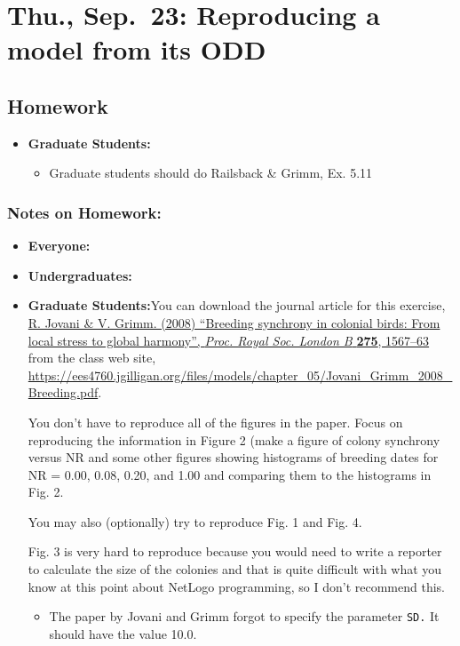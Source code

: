 \documentclass[
]{article}
\providecommand{\tightlist}{%
  \setlength{\itemsep}{0pt}\setlength{\parskip}{0pt}}
\begin{document}
\hypertarget{thu.-sep.-23-reproducing-a-model-from-its-odd}{%
\section{Thu., Sep.~23: Reproducing a model from its
ODD}\label{thu.-sep.-23-reproducing-a-model-from-its-odd}}

\hypertarget{homework-5}{%
\subsection{Homework}\label{homework-5}}

\begin{itemize}
\tightlist
\item
  \textbf{Graduate Students:}

  \begin{itemize}
  \tightlist
  \item
    Graduate students should do Railsback \& Grimm, Ex. 5.11
  \end{itemize}
\end{itemize}

\hypertarget{notes-on-homework-3}{%
\subsubsection{Notes on Homework:}\label{notes-on-homework-3}}

\begin{itemize}
\item
  \textbf{Everyone:}
\item
  \textbf{Undergraduates:}
\item
  \textbf{Graduate Students:}You can download the journal article for
  this exercise,
  \href{/files/models/chapter_05/Jovani_Grimm_2008_Breeding.pdf}{R.
  Jovani \& V. Grimm. (2008) ``Breeding synchrony in colonial birds:
  From local stress to global harmony'', \emph{Proc. Royal Soc. London
  B} \textbf{275}, 1567--63} from the class web site,
  \url{https://ees4760.jgilligan.org/files/models/chapter_05/Jovani_Grimm_2008_Breeding.pdf}.

  You don't have to reproduce all of the figures in the paper. Focus on
  reproducing the information in Figure 2 (make a figure of colony
  synchrony versus NR and some other figures showing histograms of
  breeding dates for NR = 0.00, 0.08, 0.20, and 1.00 and comparing them
  to the histograms in Fig. 2.

  You may also (optionally) try to reproduce Fig. 1 and Fig. 4.

  Fig. 3 is very hard to reproduce because you would need to write a
  reporter to calculate the size of the colonies and that is quite
  difficult with what you know at this point about NetLogo programming,
  so I don't recommend this.

  \begin{itemize}
  \tightlist
  \item
    The paper by Jovani and Grimm forgot to specify the parameter
    \texttt{SD.} It should have the value 10.0.
  \end{itemize}
\end{itemize}
\end{document}
